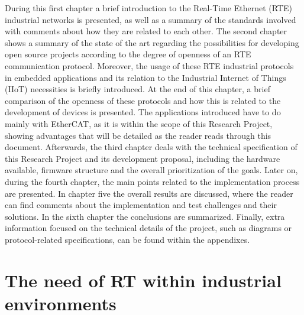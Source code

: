 During this first chapter a brief introduction to the Real-Time Ethernet (RTE) industrial networks is presented, as well as 
a summary of the standards involved with comments about how they are related to each other. 
The second chapter shows a summary of the state of the art regarding the possibilities for developing open source projects 
according to the degree of openness of an RTE communication protocol. Moreover, the usage of these RTE 
industrial protocols in embedded applications and its relation to the Industrial Internet of Things (IIoT) necessities is 
briefly introduced. At the end of this chapter, a brief comparison of the openness of these protocols and how this is related 
to the development of devices is presented.  The applications introduced have to do mainly with EtherCAT, as it is within 
the scope of this Research Project, showing advantages that will be detailed as the reader reads through this document. 
Afterwards, the third chapter deals with the technical specification of this Research Project and its development proposal, 
including the hardware available, firmware structure and the overall prioritization of the goals. 
Later on, during the fourth chapter, the main points related to the implementation process are presented. 
In chapter five the overall results are discussed, where the reader can find comments about the implementation and test 
challenges and their solutions. In the sixth chapter the conclusions are summarized. 
Finally, extra information focused on the technical details of the project, such as diagrams or protocol-related specifications, 
can be found within the appendixes.

\section{The need of RT within industrial environments}

